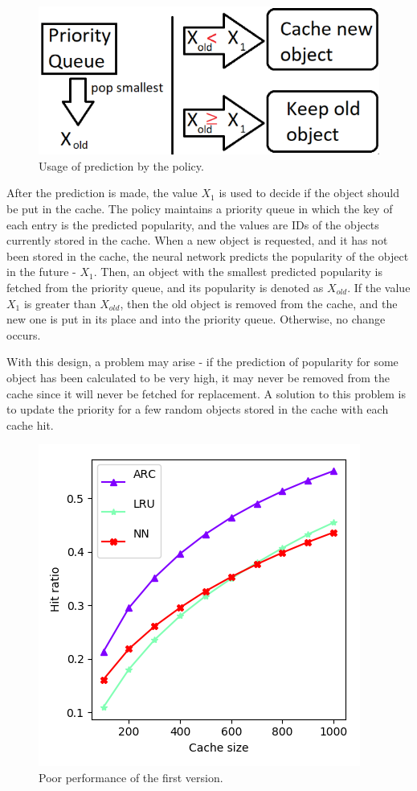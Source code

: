 \begin{figure}[t!]
	\centering
	\includegraphics[width=0.75\linewidth]{pics/cache2.png}
	\caption{Usage of prediction by the policy.}
	\label{fig:cache2}
\end{figure}

After the prediction is made, the value $X_1$ is used to decide if the object should be put in the cache. The policy maintains a priority queue in which the key of each entry is the predicted popularity, and the values are IDs of the objects currently stored in the cache. When a new object is requested, and it has not been stored in the cache, the neural network predicts the popularity of the object in the future - $X_1$. Then, an object with the smallest predicted popularity is fetched from the priority queue, and its popularity is denoted as $X_{old}$. If the value $X_1$ is greater than $X_{old}$, then the old object is removed from the cache, and the new one is put in its place and into the priority queue. Otherwise, no change occurs. 

With this design, a problem may arise - if the prediction of popularity for some object has been calculated to be very high, it may never be removed from the cache since it will never be fetched for replacement. A solution to this problem is to update the priority for a few random objects stored in the cache with each cache hit.

\begin{figure}[t!]
	\centering
	\includegraphics[width=0.5\linewidth]{pics/cache3.png}
	\caption{Poor performance of the first version.}
	\label{fig:cache3}
\end{figure}

